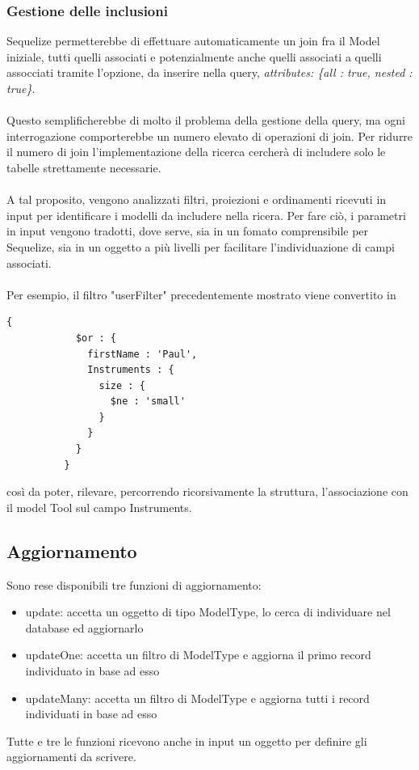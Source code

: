 \documentclass[a4paper, 12pt]{report}
\begin{document}
      \subsubsection*{Gestione delle inclusioni}
        Sequelize permetterebbe di effettuare automaticamente un join fra il Model iniziale, tutti quelli associati e potenzialmente anche quelli associati a quelli assocciati tramite l'opzione, da inserire nella query,
        \emph{attributes: \{all : true, nested : true\}}.
        \paragraph*{}
        Questo semplificherebbe di molto il problema della gestione della query, ma ogni interrogazione comporterebbe un numero elevato di operazioni di join.
        Per ridurre il numero di join l'implementazione della ricerca cercherà di includere solo le tabelle strettamente necessarie.
        \paragraph*{}
        A tal proposito, vengono analizzati filtri, proiezioni e ordinamenti ricevuti in input per identificare i modelli da includere nella ricera.
        Per fare ciò, i parametri in input vengono tradotti, dove serve, sia in un fomato comprensibile per Sequelize, sia in un oggetto a più livelli per facilitare l'individuazione di campi associati.
        \paragraph*{}
        Per esempio, il filtro "userFilter" precedentemente mostrato viene convertito in
        \begin{Verbatim}[samepage=true]
          {
            $or : {
              firstName : 'Paul',
              Instruments : {
                size : {
                  $ne : 'small'
                }
              }
            }
          }
        \end{Verbatim}
        così da poter, rilevare, percorrendo ricorsivamente la struttura, l'associazione con il model Tool sul campo Instruments.
    \newpage
    \subsection{Aggiornamento}
      Sono rese disponibili tre funzioni di aggiornamento: 
      \begin{itemize}
        \item update: accetta un oggetto di tipo ModelType, lo cerca di individuare nel database ed aggiornarlo
        \item updateOne: accetta un filtro di ModelType e aggiorna il primo record individuato in base ad esso
        \item updateMany: accetta un filtro di ModelType e aggiorna tutti i record individuati in base ad esso
      \end{itemize} 
      Tutte e tre le funzioni ricevono anche in input un oggetto per definire gli aggiornamenti da scrivere.
\end{document}
